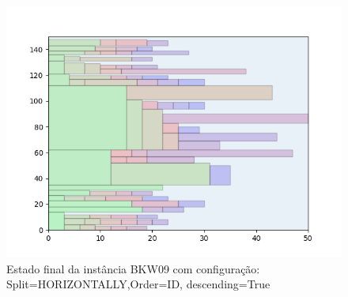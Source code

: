 \begin{figure}[H]
    \centering
    \caption[]{Estado final da instância BKW09 com configuração: Split=HORIZONTALLY,Order=ID, descending=True}
    \label{fig:bkw09-horizontally-id-true}
    \includegraphics[scale=0.5]{output/figures/bkw/bkw09/horizontally/id/true/000}
\end{figure}